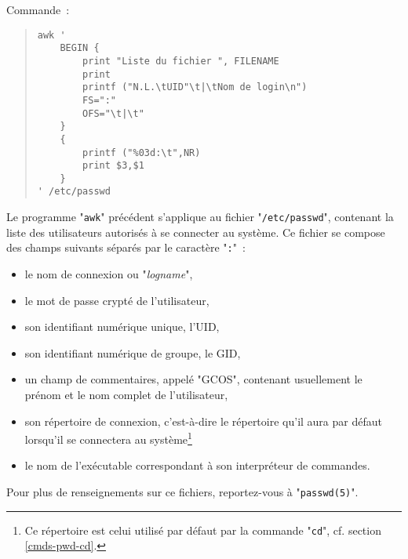 \begin{example}
Commande~:
\begin{quote}
\begin{verbatim}
awk '
    BEGIN {
        print "Liste du fichier ", FILENAME
        print
        printf ("N.L.\tUID"\t|\tNom de login\n")
        FS=":"
        OFS="\t|\t"
    }
    {
        printf ("%03d:\t",NR)
        print $3,$1
    }
' /etc/passwd
\end{verbatim}
\end{quote}

Le programme "\texttt{awk}" pr{\'e}c{\'e}dent s'applique au fichier "\texttt{/etc/passwd}",
contenant la liste des utilisateurs autoris{\'e}s {\`a} se connecter au syst{\`e}me. Ce fichier
se compose des champs suivants s{\'e}par{\'e}s par le caract{\`e}re "\texttt{:}"~:
\begin{itemize}
	\item	le nom de connexion ou "\textsl{logname}",
	\item	le mot de passe crypt{\'e} de l'utilisateur,
	\item	son identifiant num{\'e}rique unique, l'UID,
	\item	son identifiant num{\'e}rique de groupe, le GID,
	\item	un champ de commentaires, appel{\'e} "GCOS", contenant usuellement
			le pr{\'e}nom et le nom complet de l'utilisateur,
	\item	son r{\'e}pertoire de connexion, c'est-{\`a}-dire le r{\'e}pertoire qu'il aura
			par d{\'e}faut lorsqu'il se connectera au syst{\`e}me\footnote{Ce r{\'e}pertoire
			est celui utilis{\'e} par d{\'e}faut par la commande "\texttt{cd}", cf.
			section \ref{cmds-pwd-cd}.}
	\item	le nom de l'ex{\'e}cutable correspondant {\`a} son interpr{\'e}teur de commandes.
\end{itemize}
Pour plus de renseignements sur ce fichiers, reportez-vous {\`a} "\texttt{passwd(5)}".


\end{example}
